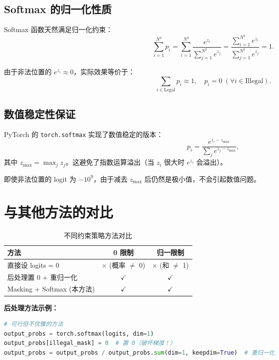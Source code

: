 \documentclass[oneside]{ctexbook}
\begin{document}
\subsection{Softmax 的归一化性质}

Softmax 函数天然满足归一化约束：
\begin{equation}
\sum_{i=1}^{N^2} p_i = \sum_{i=1}^{N^2} \frac{e^{z_i}}{\sum_{j=1}^{N^2} e^{z_j}} = \frac{\sum_{i=1}^{N^2} e^{z_i}}{\sum_{j=1}^{N^2} e^{z_j}} = 1.
\end{equation}

由于非法位置的 $e^{z_i} \approx 0$，实际效果等价于：
\begin{equation}
\sum_{i \in \text{Legal}} p_i \approx 1, \quad p_i = 0 \; (\forall i \in \text{Illegal}).
\end{equation}

\subsection{数值稳定性保证}

PyTorch 的 \texttt{torch.softmax} 实现了数值稳定的版本：
\begin{equation}
p_i = \frac{e^{z_i - z_{\max}}}{\sum_j e^{z_j - z_{\max}}},
\end{equation}
其中 $z_{\max} = \max_j z_j$。这避免了指数运算溢出（当 $z_i$ 很大时 $e^{z_i}$ 会溢出）。

即使非法位置的 logit 为 $-10^9$，由于减去 $z_{\max}$ 后仍然是极小值，不会引起数值问题。

\section{与其他方法的对比}

\begin{table}[H]
\centering
\begin{tabular}{lcc}
\toprule
\textbf{方法} & \textbf{0 限制} & \textbf{归一限制} \\
\midrule
直接设 logits = 0 & $\times$ (概率 $\neq$ 0) & $\times$ (和 $\neq$ 1) \\
后处理置 0 + 重归一化 & $\checkmark$ & $\checkmark$ \\
Masking + Softmax (本方法) & $\checkmark$ & $\checkmark$ \\
\bottomrule
\end{tabular}
\caption{不同约束策略方法对比}
\end{table}

\textbf{后处理方法示例：}
\begin{lstlisting}[language=Python]
# 可行但不优雅的方法
output_probs = torch.softmax(logits, dim=1)
output_probs[illegal_mask] = 0  # 置 0（破坏梯度！）
output_probs = output_probs / output_probs.sum(dim=1, keepdim=True)  # 重归一化
\end{lstlisting}
\end{document}
